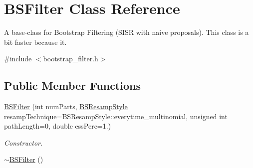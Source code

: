 \hypertarget{classBSFilter}{}\section{B\+S\+Filter Class Reference}
\label{classBSFilter}


A base-\/class for Bootstrap Filtering (S\+I\+SR with naive proposals). This class is a bit faster because it.  




{\ttfamily \#include $<$bootstrap\+\_\+filter.\+h$>$}

\subsection*{Public Member Functions}
\begin{DoxyCompactItemize}
\item 
\hyperlink{classBSFilter_acf56f49838e7cd4bbc131dd23f0bebe3}{B\+S\+Filter} (int num\+Parts, \hyperlink{bootstrap__filter_8h_a476b3b5754056a34ac843629c9570b49}{B\+S\+Resamp\+Style} resamp\+Technique=B\+S\+Resamp\+Style\+::everytime\+\_\+multinomial, unsigned int path\+Length=0, double ess\+Perc=1.)
\begin{DoxyCompactList}\small\item\em Constructor. \end{DoxyCompactList}\item 
\hyperlink{classBSFilter_aff30bee4608cadfda7dd49a0d57bb39c}{$\sim$\+B\+S\+Filter} ()\hypertarget{classBSFilter_aff30bee4608cadfda7dd49a0d57bb39c}{}\label{classBSFilter_aff30bee4608cadfda7dd49a0d57bb39c}


\end{DoxyCompactItemize}
